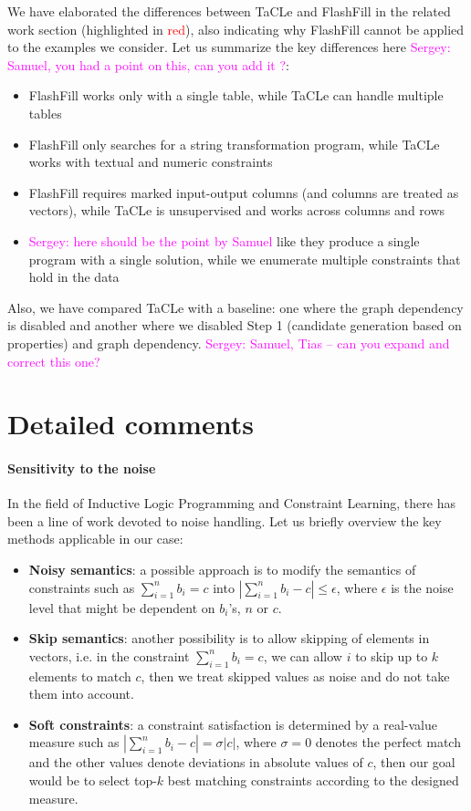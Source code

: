\documentclass{article}
\newcommand{\sergey}[1]{\textcolor{magenta}{{\sc Sergey:} #1}\xspace}
\begin{document}
We have elaborated the differences between TaCLe and FlashFill in the related work section (highlighted in \textcolor{red}{red}), also indicating why FlashFill cannot be applied to the examples we consider. Let us summarize the key differences here \sergey{Samuel, you had a point on this, can you add it ?}:
\begin{itemize}
  \item FlashFill works only with a single table, while TaCLe can handle multiple tables
  \item FlashFill only searches for a string transformation program, while TaCLe works with textual and numeric constraints
  \item FlashFill requires marked input-output columns (and columns are treated as vectors), while TaCLe is unsupervised and works across columns and rows
  \item \sergey{here should be the point by Samuel} like they produce a single program with a single solution, while we enumerate multiple constraints that hold in the data
\end{itemize}


Also, we have compared TaCLe with a baseline: one where the graph dependency is disabled and another where we disabled Step 1 (candidate generation based on properties) and graph dependency. \sergey{Samuel, Tias -- can you expand and correct this one?}

\section{Detailed comments}

\paragraph{Sensitivity to the noise}
In the field of Inductive Logic Programming and Constraint Learning, there has been a line of work devoted to noise handling. Let us briefly overview the key methods applicable in our case:
\begin{itemize}
  \item \textbf{Noisy semantics}: a possible approach is to modify the semantics of constraints such as $\sum_{i=1}^n b_i = c$ into $|\sum_{i=1}^n b_i - c| \leq \epsilon$, where $\epsilon$ is the noise level that might be dependent on $b_i$'s, $n$ or $c$.
  \item \textbf{Skip semantics}: another possibility is to allow skipping of elements in vectors, i.e. in the constraint  $\sum_{i=1}^n b_i = c$, we can allow $i$ to skip up to $k$ elements to match $c$, then we treat skipped values as noise and do not take them into account.
  \item \textbf{Soft constraints}: a constraint satisfaction is determined by a real-value measure such as $|\sum_{i=1}^n b_i - c | = \sigma|c|$, where $\sigma=0$ denotes the perfect match and the other values denote deviations in absolute values of $c$, then our goal would be to select top-$k$ best matching constraints according to the designed measure.
\end{itemize}
\end{document}

